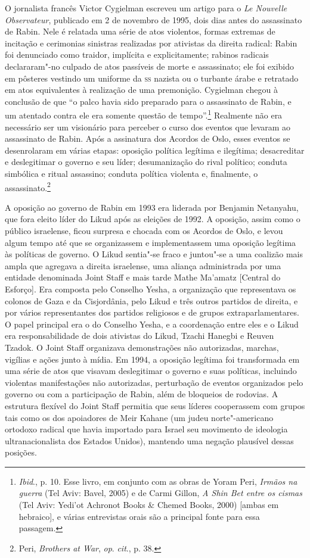 O jornalista francês Victor Cygielman escreveu um artigo para o \textit{Le
Nouvelle Observateur}, publicado em 2 de novembro de 1995, dois
dias antes do assassinato de Rabin. Nele é relatada uma série de atos
violentos, formas extremas de incitação e cerimonias sinistras
realizadas por ativistas da direita radical: Rabin foi denunciado como
traidor, implícita e explicitamente; rabinos radicais declararam"-no
culpado de atos passíveis de morte e assassinato; ele foi exibido em
pôsteres vestindo um uniforme da \textsc{ss} nazista ou o turbante árabe e
retratado em atos equivalentes à realização de uma premonição. Cygielman
chegou à conclusão de que ``o palco havia sido preparado para o assassinato
de Rabin, e um atentado contra ele era somente questão de
tempo''.\footnote{\textit{Ibid}., p. 10. Esse livro, em conjunto com as obras de Yoram Peri, \textit{Irmãos na guerra} (Tel Aviv: Bavel, 2005) e de Carmi Gillon, \textit{A Shin Bet entre os cismas} (Tel
Aviv: Yedi'ot Achronot Books \& Chemed Books, 2000) {[}ambas em hebraico{]}, e várias entrevistas orais são a principal fonte para essa
passagem.} Realmente não era necessário ser um visionário para
perceber o curso dos eventos que levaram ao assassinato de Rabin. Após a
assinatura dos Acordos de Oslo, esses eventos se desenrolaram em várias
etapas: oposição política legítima e ilegítima; desacreditar e
deslegitimar o governo e seu líder; desumanização do rival político;
conduta simbólica e ritual assassino; conduta política violenta e,
finalmente, o assassinato.\footnote{Peri, \textit{Brothers at War}, \textit{op}.
\textit{cit}., p. 38.}

A oposição ao governo de Rabin em 1993 era liderada por Benjamin
Netanyahu, que fora eleito líder do Likud após as eleições de 1992. A
oposição, assim como o público israelense, ficou surpresa e chocada com
os Acordos de Oslo, e levou algum tempo até que se organizassem e
implementassem uma oposição legítima às políticas de governo. O Likud
sentia"-se fraco e juntou"-se a uma coalizão mais ampla que agregava a
direita israelense, uma aliança administrada por uma entidade
denominada Joint Staff e mais tarde Mathe Ma'amatz {[}Central do Esforço{]}.
Era composta pelo Conselho Yesha, a organização que representava os colonos
de Gaza e da Cisjordânia, pelo Likud e três outros partidos de direita, e
por vários representantes dos partidos religiosos e de grupos
extraparlamentares. O papel principal era o do Conselho Yesha, e a
coordenação entre eles e o Likud era responsabilidade de dois ativistas
do Likud, Tzachi Hanegbi e Reuven Tzadok. O Joint Staff organizava
demonstrações não autorizadas, marchas, vigílias e ações junto à mídia.
Em 1994, a oposição legítima foi transformada em uma série de atos que
visavam deslegitimar o governo e suas políticas, incluindo violentas
manifestações não autorizadas, perturbação de eventos organizados pelo
governo ou com a participação de Rabin, além de bloqueios de rodovias. A
estrutura flexível do Joint Staff permitia que seus líderes cooperassem
com grupos tais como os dos apoiadores de Meir Kahane (um judeu
norte"-americano ortodoxo radical que havia importado para Israel seu
movimento de ideologia ultranacionalista dos Estados Unidos), mantendo
uma negação plausível dessas posições.

